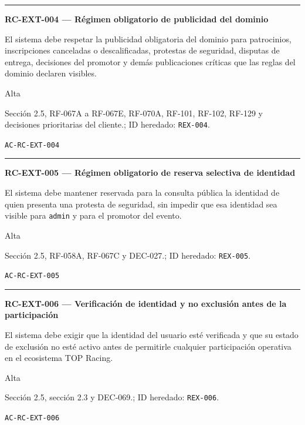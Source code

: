 \documentclass[10pt,letterpaper]{article}
\begin{document}
\vspace{0.25em}\hrule\vspace{0.65em}
\noindent\textbf{RC-EXT-004 --- Régimen obligatorio de publicidad del dominio}\par
\begin{description}[style=nextline,leftmargin=3.15cm,labelwidth=2.8cm,font=\normalfont\bfseries]
\item[Obligación] El sistema debe respetar la publicidad obligatoria del dominio para patrocinios, inscripciones canceladas o descalificadas, protestas de seguridad, disputas de entrega, decisiones del promotor y demás publicaciones críticas que las reglas del dominio declaren visibles.
\item[Prioridad] Alta
\item[Procedencia] Sección 2.5, RF-067A a RF-067E, RF-070A, RF-101, RF-102, RF-129 y decisiones prioritarias del cliente.; ID heredado: \texttt{REX-004}.
\item[Verificación] \texttt{AC-RC-EXT-004}
\end{description}
\vspace{0.25em}\hrule\vspace{0.65em}
\noindent\textbf{RC-EXT-005 --- Régimen obligatorio de reserva selectiva de identidad}\par
\begin{description}[style=nextline,leftmargin=3.15cm,labelwidth=2.8cm,font=\normalfont\bfseries]
\item[Obligación] El sistema debe mantener reservada para la consulta pública la identidad de quien presenta una protesta de seguridad, sin impedir que esa identidad sea visible para \texttt{admin} y para el promotor del evento.
\item[Prioridad] Alta
\item[Procedencia] Sección 2.5, RF-058A, RF-067C y DEC-027.; ID heredado: \texttt{REX-005}.
\item[Verificación] \texttt{AC-RC-EXT-005}
\end{description}
\vspace{0.25em}\hrule\vspace{0.65em}
\noindent\textbf{RC-EXT-006 --- Verificación de identidad y no exclusión antes de la participación}\par
\begin{description}[style=nextline,leftmargin=3.15cm,labelwidth=2.8cm,font=\normalfont\bfseries]
\item[Obligación] El sistema debe exigir que la identidad del usuario esté verificada y que su estado de exclusión no esté activo antes de permitirle cualquier participación operativa en el ecosistema TOP Racing.
\item[Prioridad] Alta
\item[Procedencia] Sección 2.5, sección 2.3 y DEC-069.; ID heredado: \texttt{REX-006}.
\item[Verificación] \texttt{AC-RC-EXT-006}
\end{description}
\end{document}
